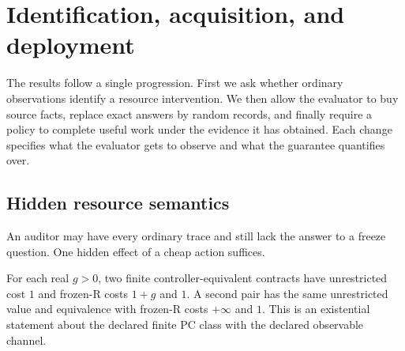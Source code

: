 \section{Identification, acquisition, and deployment}\label{app:principal}

The results follow a single progression. First we ask whether ordinary observations identify a resource intervention. We then allow the evaluator to buy source facts, replace exact answers by random records, and finally require a policy to complete useful work under the evidence it has obtained. Each change specifies what the evaluator gets to observe and what the guarantee quantifies over.

\subsection{Hidden resource semantics}

An auditor may have every ordinary trace and still lack the answer to a freeze question. One hidden effect of a cheap action suffices.

\begin{theorem}\label{thm:t01}

For each real \(g>0\), two finite controller-equivalent contracts have unrestricted cost \(1\) and frozen-R costs \(1+g\) and \(1\). A second pair has the same unrestricted value and equivalence with frozen-R costs \(+\infty\) and \(1\). This is an existential statement about the declared finite PC class with the declared observable channel.

\end{theorem}

